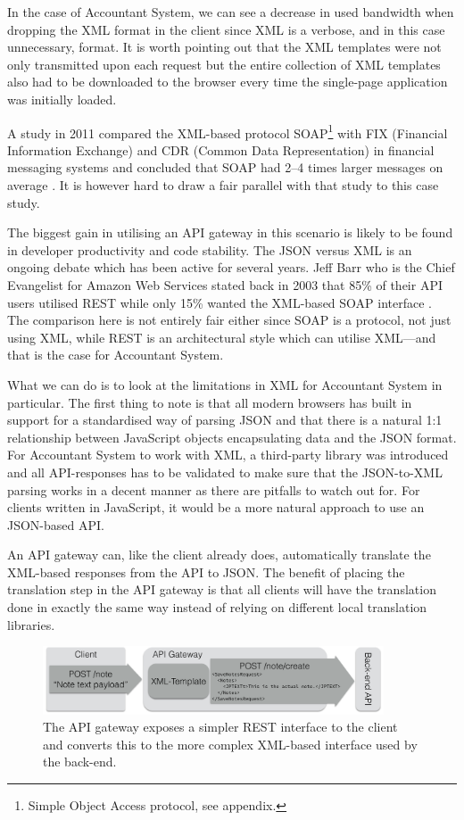 \documentclass{cslthse-msc}
\begin{document}
In the case of Accountant System, we can see a decrease in used bandwidth when dropping the XML format in the client since XML is a verbose, and in this case unnecessary, format. It is worth pointing out that the XML templates were not only transmitted upon each request but the entire collection of XML templates also had to be downloaded to the browser every time the single-page application was initially loaded. 

A study in 2011 compared the XML-based protocol SOAP\footnote{Simple Object Access protocol, see appendix.} with FIX (Financial Information Exchange) and CDR (Common Data Representation) in financial messaging systems and concluded that SOAP had 2--4 times larger messages on average \cite{soap_fix}. It is however hard to draw a fair parallel with that study to this case study.

The biggest gain in utilising an API gateway in this scenario is likely to be found in developer productivity and code stability. The JSON versus XML is an ongoing debate which has been active for several years. Jeff Barr who is the Chief Evangelist for Amazon Web Services stated back in 2003 that 85\% of their API users utilised REST while only 15\% wanted the XML-based SOAP interface \cite{soap_amazon}. The comparison here is not entirely fair either since SOAP is a protocol, not just using XML, while REST is an architectural style which can utilise XML---and that is the case for Accountant System.

What we can do is to look at the limitations in XML for Accountant System in particular. The first thing to note is that all modern browsers has built in support for a standardised way of parsing JSON and that there is a natural 1:1 relationship between JavaScript objects encapsulating data and the JSON format. For Accountant System to work with XML, a third-party library was introduced and all API-responses has to be validated to make sure that the JSON-to-XML parsing works in a decent manner as there are pitfalls to watch out for. For clients written in JavaScript, it would be a more natural approach to use an JSON-based API.

An API gateway can, like the client already does, automatically translate the XML-based responses from the API to JSON. The benefit of placing the translation step in the API gateway is that all clients will have the translation done in exactly the same way instead of relying on different local translation libraries.

\begin{figure}[H]
  \centering
    \begin{center}
      \includegraphics[width=0.9\textwidth]{images/api_gateway_xml.png}
    \end{center}
  \caption{The API gateway exposes a simpler REST interface to the client and converts this to the more complex XML-based interface used by the back-end.}
\end{figure}
\end{document}
